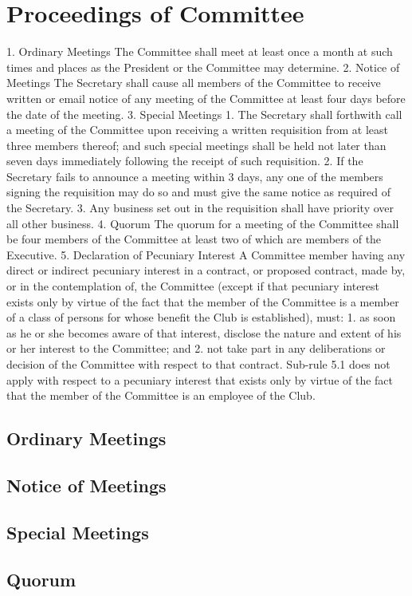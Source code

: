 \documentclass[12pt]{article} %
\begin{document}
\section{Proceedings of Committee}
1. Ordinary Meetings
The Committee shall meet at least once a month at such times and places as the
President or the Committee may determine.
2. Notice of Meetings
The Secretary shall cause all members of the Committee to receive written or email
notice of any meeting of the Committee at least four days before the date of the
meeting.
3. Special Meetings
1. The Secretary shall forthwith call a meeting of the Committee upon receiving
a written requisition from at least three members thereof; and such special
meetings shall be held not later than seven days immediately following the
receipt of such requisition.
2. If the Secretary fails to announce a meeting within 3 days, any one of the
members signing the requisition may do so and must give the same notice as
required of the Secretary.
3. Any business set out in the requisition shall have priority over all other
business.
4. Quorum
The quorum for a meeting of the Committee shall be four members of the Committee
at least two of which are members of the Executive.
5. Declaration of Pecuniary Interest
A Committee member having any direct or indirect pecuniary interest in a contract, or
proposed contract, made by, or in the contemplation of, the Committee (except if that
pecuniary interest exists only by virtue of the fact that the member of the Committee
is a member of a class of persons for whose benefit the Club is established), must:
1. as soon as he or she becomes aware of that interest, disclose the nature and
extent of his or her interest to the Committee; and
2. not take part in any deliberations or decision of the Committee with respect to
that contract.
Sub-rule 5.1 does not apply with respect to a pecuniary interest that exists only by
virtue of the fact that the member of the Committee is an employee of the Club.
\subsection{Ordinary Meetings}
\subsection{Notice of Meetings}
\subsection{Special Meetings}
\subsection{Quorum}
\end{document}
